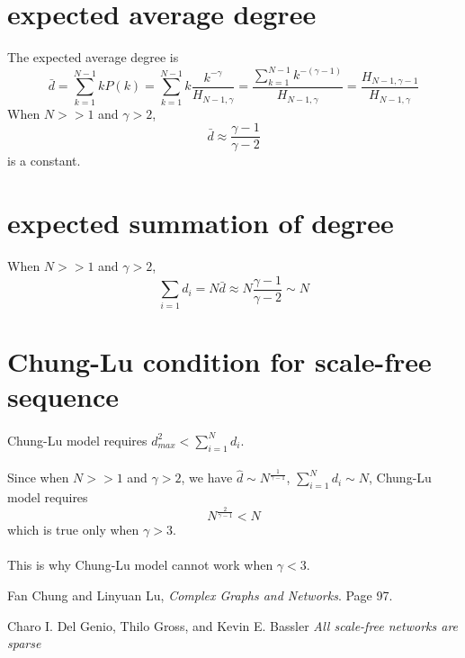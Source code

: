 \documentclass{article}
\begin{document}
\section{expected average degree}
The expected average degree is
\begin{equation}
\bar{d}=\sum_{k=1}^{N-1} k P(k) =\sum_{k=1}^{N-1} k \frac{k^{-\gamma}}{H_{N-1,\gamma}}=\frac{\sum_{k=1}^{N-1}k^{-(\gamma-1)}}{H_{N-1,\gamma}}=\frac{H_{N-1,\gamma-1}}{H_{N-1,\gamma}}
\end{equation}
When $N>>1$ and $\gamma>2$,
\begin{equation}
\bar{d}\approx \frac{\gamma-1}{\gamma-2}
\end{equation}
is a constant.

\section{expected summation of degree}
When $N>>1$ and $\gamma>2$,
\begin{equation}
\sum_{i=1} d_i = N \bar{d} \approx N \frac{\gamma-1}{\gamma-2} \sim N
\end{equation}

\section{Chung-Lu condition for scale-free sequence}
\paragraph{}
Chung-Lu model requires $d_{max}^2 < \sum_{i=1}^N d_i$. 
\paragraph{}
Since when $N>>1$ and $\gamma>2$, we have $\hat{d} \sim N^{ \frac{1}{\gamma-1}}$, $\sum_{i=1}^{N} d_i \sim N$, Chung-Lu model requires
\begin{equation}
N^{\frac{2}{\gamma-1}} < N
\end{equation}
which is true only when $\gamma > 3$.

\paragraph{}
This is why Chung-Lu model cannot work when $\gamma<3$.



\begin{thebibliography}{9}
Fan Chung and Linyuan Lu,
\textit{Complex Graphs and Networks}. Page 97.
 
Charo I. Del Genio, Thilo Gross, and Kevin E. Bassler
\textit{All scale-free networks are sparse}
\end{thebibliography}
 
\end{document}
